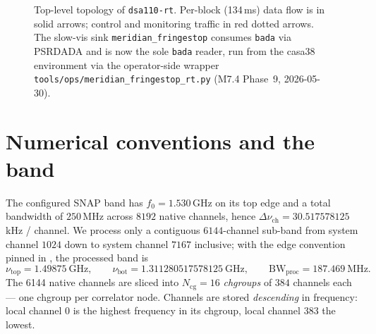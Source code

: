 \documentclass[11pt,a4paper]{article}
\newcommand{\nutop}{\nu_\mathrm{top}}
\newcommand{\nubot}{\nu_\mathrm{bot}}
\newcommand{\dnu}{\Delta\nu_\mathrm{ch}}
\newcommand{\codeword}[1]{\text{\ttfamily\small\detokenize{#1}}}
\begin{document}
\begin{figure}[ht]
{
}%
\caption{Top-level topology of \texttt{dsa110-rt}.  Per-block (134\,ms) data
flow is in solid arrows; control and monitoring traffic in red dotted arrows.
The slow-vis sink \texttt{meridian\_fringestop} consumes \texttt{bada} via
PSRDADA and is now the sole \texttt{bada} reader, run from the casa38
environment via the operator-side wrapper
\texttt{tools/ops/meridian\_fringestop\_rt.py} (M7.4 Phase~9, 2026-05-30).}
\label{fig:topfig}
\end{figure}


\section{Numerical conventions and the band}
\label{sec:numconv}

The configured SNAP band has $f_0 = 1.530$\,GHz on its top edge and a
total bandwidth of $250$\,MHz across $8192$ native channels, hence
$\dnu = 30.517578125$\,kHz / channel.  We process only a contiguous
$6144$-channel sub-band from system channel $1024$ down to system
channel $7167$ inclusive; with the edge convention pinned in
\codeword{src/dsart/common/constants.py::freq_GHz}, the processed
band is
\[
\nutop = 1.49875~\mathrm{GHz},\qquad
\nubot = 1.311280517578125~\mathrm{GHz},\qquad
\mathrm{BW}_\mathrm{proc} = 187.469~\mathrm{MHz}.
\]
The 6144 native channels are sliced into $N_\mathrm{cg}=16$
\emph{chgroups} of $384$ channels each --- one chgroup per correlator
node.  Channels are stored \emph{descending} in frequency: local
channel 0 is the highest frequency in its chgroup, local channel 383
the lowest.
\end{document}
